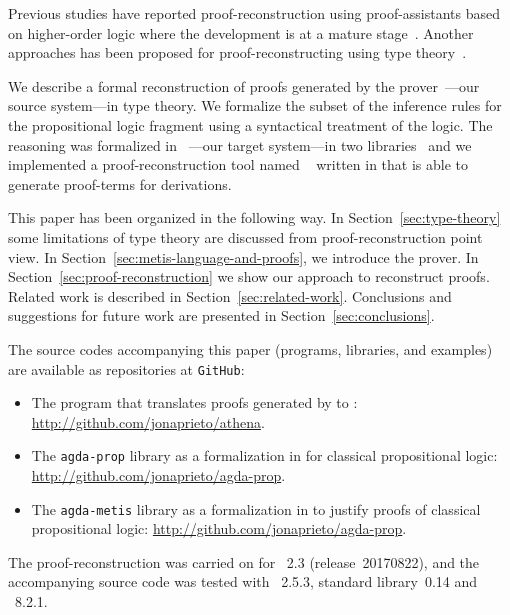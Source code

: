 \documentclass[../main.tex]{subfiles}
\begin{document}
Previous studies have reported proof-reconstruction using
proof-assistants based on higher-order logic where the development is
at a mature
stage~\cite{paulson2010three,hurlin07practical,kaliszyk2013}. Another
approaches has been proposed for proof-reconstructing using type
theory~\cite{Bezem2002,armand2011,Ekici2017,kanso2016light}.

We describe a formal reconstruction of proofs generated by the \Metis
prover~\cite{hurd2003first}---our source system---in type theory. We
formalize the subset of the \Metis inference rules for the
propositional logic fragment using a syntactical treatment of the
logic. The \Metis reasoning was formalized in
\Agda~\cite{agdateam}---our target system---in two
libraries~\cite{AgdaProp,AgdaMetis} and we implemented a
proof-reconstruction tool named \Athena~\cite{Athena} written in
\Haskell that is able to generate \Agda proof-terms for \Metis
derivations.

This paper has been organized in the following way.
In Section~\ref{sec:type-theory} some limitations of type theory
are discussed from proof-reconstruction point view.
In Section~\ref{sec:metis-language-and-proofs}, we introduce the
\Metis prover.
In Section~\ref{sec:proof-reconstruction} we show our
approach to reconstruct \Metis proofs.
Related work is described in Section~\ref{sec:related-work}.
Conclusions and suggestions for future work are  presented in
Section~\ref{sec:conclusions}.


The source codes accompanying this paper (programs, libraries, and
examples) are available as repositories at \verb!GitHub!:

\begin{itemize}
  \item The \Athena program that translates proofs generated by \Metis to \Agda:
  \url{http://github.com/jonaprieto/athena}.
  \item The \verb!agda-prop! library as a formalization in \Agda for
    classical propositional logic:
  \url{http://github.com/jonaprieto/agda-prop}.
\item The \verb!agda-metis! library as a formalization in \Agda to
  justify \Metis proofs of classical propositional logic:
  \url{http://github.com/jonaprieto/agda-prop}.
\end{itemize}

The proof-reconstruction was carried on for \Metis~2.3
(release~20170822), and the accompanying source code was tested with
\Agda~2.5.3, \Agda standard library~0.14 and ~8.2.1.
\end{document}
